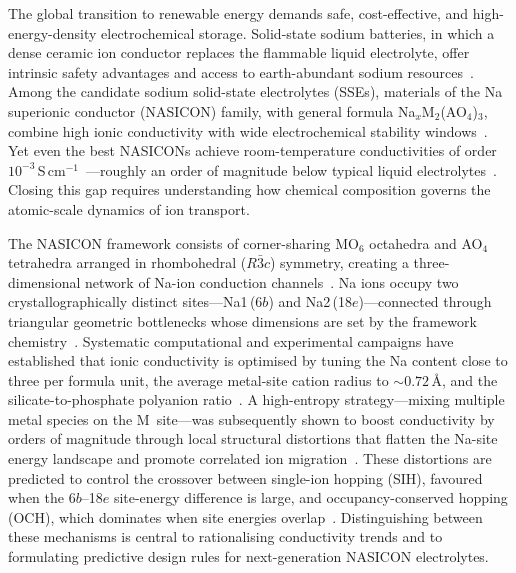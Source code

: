 
The global transition to renewable energy demands safe, cost-effective, and
high-energy-density electrochemical storage.  Solid-state sodium batteries, in
which a dense ceramic ion conductor replaces the flammable liquid electrolyte,
offer intrinsic safety advantages and access to earth-abundant sodium
resources~\cite{Famprikis2019,Zhao2018}.  Among the candidate sodium
solid-state electrolytes (SSEs), materials of the Na superionic conductor
(NASICON) family, with general formula
Na$_{x}$M$_{2}$(AO$_{4}$)$_{3}$, combine high ionic conductivity with wide
electrochemical stability windows~\cite{Li2022,Wang2023}.  Yet even the best
NASICONs achieve room-temperature conductivities of order
$10^{-3}$\,S\,cm$^{-1}$~\cite{Ma2019,Wang2023}---roughly an order of
magnitude below typical liquid electrolytes~\cite{He2025}.  Closing this gap
requires understanding how chemical composition governs the atomic-scale
dynamics of ion transport.

The NASICON framework consists of corner-sharing MO$_{6}$ octahedra and
AO$_{4}$ tetrahedra arranged in rhombohedral ($R\bar{3}c$) symmetry, creating
a three-dimensional network of Na-ion conduction
channels~\cite{Wang2023}.  Na ions occupy two crystallographically distinct
sites---Na1\,(6$b$) and Na2\,(18$e$)---connected through triangular geometric
bottlenecks whose dimensions are set by the framework
chemistry~\cite{He2025,Wang2023}.  Systematic computational and experimental
campaigns have established that ionic conductivity is optimised by tuning the
Na content close to three per formula unit, the average metal-site cation radius to
${\sim}0.72$\,\AA, and the silicate-to-phosphate polyanion
ratio~\cite{Wang2023,Ouyang2021}.  A high-entropy strategy---mixing multiple
metal species on the M~site---was subsequently shown to boost conductivity by
orders of magnitude through local structural distortions that flatten the
Na-site energy landscape and promote correlated ion
migration~\cite{Zeng2022}.  These distortions are predicted to control the
crossover between single-ion hopping (SIH), favoured when the
6$b$--18$e$ site-energy difference is large, and occupancy-conserved hopping
(OCH), which dominates when site energies
overlap~\cite{He2025}.  Distinguishing between these mechanisms is central to
rationalising conductivity trends and to formulating predictive design rules
for next-generation NASICON electrolytes.

